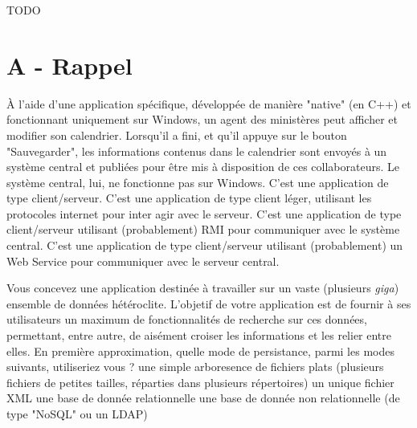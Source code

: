 \documentclass[a4paper,10pt]{article}
\begin{document}
\begin{center}
  \begin{Large}
    TODO
  \end{Large}
\end{center}

\section{A - Rappel}

\begin{question}{À l'aide d'une application spécifique, développée de manière "native" (en C++)
et fonctionnant uniquement sur Windows, un agent des ministères peut afficher et modifier son
calendrier. Lorsqu'il a fini, et qu'il appuye sur le bouton "Sauvegarder", les informations contenus
dans le calendrier sont envoyés à un système central et publiées pour être mis à disposition de ces
collaborateurs. Le système central, lui, ne fonctionne pas sur Windows.}
  \true C'est une application de type client/serveur.
  \false C'est une application de type client léger, utilisant les protocoles internet pour inter
  agir avec le serveur.
  \false C'est une application de type client/serveur utilisant (probablement) RMI pour communiquer
  avec le système central.
  \false C'est une application de type client/serveur utilisant (probablement) un Web Service pour
  communiquer avec le serveur central.
\end{question}

\begin{question}{Vous concevez une application destinée à travailler sur un vaste (plusieurs
\textit{giga}) ensemble de données hétéroclite. L'objetif de votre application est de fournir à ses
utilisateurs un maximum de fonctionnalités de recherche sur ces données, permettant, entre autre, de
aisément croiser les informations et les relier entre elles. En première approximation, quelle mode
de persistance, parmi les modes suivants, utiliseriez vous ?}
  \false une simple arboresence de fichiers plats (plusieurs fichiers de petites tailles, réparties
  dans plusieurs répertoires)
  \false un unique fichier XML
  \true une base de donnée relationnelle
  \true une base de donnée non relationnelle (de type "NoSQL" ou un LDAP)
\end{question}
\end{document}
